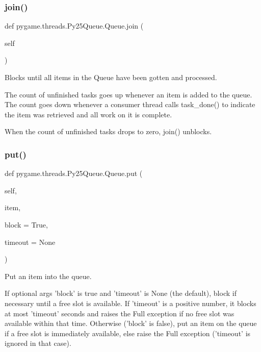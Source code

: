 \subsubsection{\texorpdfstring{join()}{join()}}
{\footnotesize\ttfamily def pygame.\+threads.\+Py25\+Queue.\+Queue.\+join (\begin{DoxyParamCaption}\item[{}]{self }\end{DoxyParamCaption})}

\begin{DoxyVerb}Blocks until all items in the Queue have been gotten and processed.

The count of unfinished tasks goes up whenever an item is added to the
queue. The count goes down whenever a consumer thread calls task_done()
to indicate the item was retrieved and all work on it is complete.

When the count of unfinished tasks drops to zero, join() unblocks.
\end{DoxyVerb}
 \mbox{\label{classpygame_1_1threads_1_1_py25_queue_1_1_queue_a08a34ad15e2d0e5badf8a6e3b2226c56}} 
\subsubsection{\texorpdfstring{put()}{put()}}
{\footnotesize\ttfamily def pygame.\+threads.\+Py25\+Queue.\+Queue.\+put (\begin{DoxyParamCaption}\item[{}]{self,  }\item[{}]{item,  }\item[{}]{block = {\ttfamily True},  }\item[{}]{timeout = {\ttfamily None} }\end{DoxyParamCaption})}

\begin{DoxyVerb}Put an item into the queue.

If optional args 'block' is true and 'timeout' is None (the default),
block if necessary until a free slot is available. If 'timeout' is
a positive number, it blocks at most 'timeout' seconds and raises
the Full exception if no free slot was available within that time.
Otherwise ('block' is false), put an item on the queue if a free slot
is immediately available, else raise the Full exception ('timeout'
is ignored in that case).
\end{DoxyVerb}
 \mbox{\label{classpygame_1_1threads_1_1_py25_queue_1_1_queue_ae0fb745e2e4e17fe2083a10eb47906f3}} 
